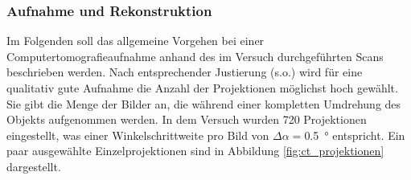 \documentclass[11pt, a4paper]{article}
\numberwithin{equation}{section}
\begin{document}
\subsubsection{Aufnahme und Rekonstruktion}
\label{ct_aufnahme}

Im Folgenden soll das allgemeine Vorgehen bei einer Computertomografieaufnahme anhand des im Versuch durchgeführten Scans beschrieben werden.
Nach entsprechender Justierung (s.o.) wird für eine qualitativ gute Aufnahme die Anzahl der Projektionen möglichst hoch gewählt.
Sie gibt die Menge der Bilder an, die während einer kompletten Umdrehung des Objekts aufgenommen werden.
In dem Versuch wurden \num{720} Projektionen eingestellt, was einer Winkelschrittweite pro Bild von $\Delta\alpha=$\SI{0.5}{\degree} entspricht.
Ein paar ausgewählte Einzelprojektionen sind in Abbildung \ref{fig:ct_projektionen} dargestellt.
\end{document}
